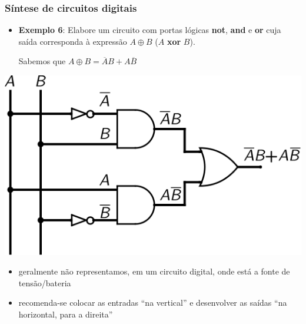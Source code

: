 \documentclass{beamer}
\begin{document}
\begin{frame}
\frametitle{Síntese de circuitos digitais}

\begin{itemize}
\item \textbf{Exemplo 6}: Elabore um circuito com portas lógicas \textbf{not}, \textbf{and} e \textbf{or} cuja saída corresponda à expressão $A \oplus B$ ($A$ \textbf{xor} $B$).\\[6pt]

\pause

Sabemos que $A \oplus B = \overline{A}B + A\overline{B}$\\[6pt]
\end{itemize}

\pause

\begin{center}
\includegraphics[scale=0.8]{images/exemplo1}
\end{center}

\pause

\begin{itemize}
\item geralmente não representamos, em um circuito digital, onde está a fonte de tensão/bateria
\pause
\item recomenda-se colocar as entradas ``na vertical'' e desenvolver as saídas ``na horizontal, para a direita''

\end{itemize}

\end{frame}

\end{document}
